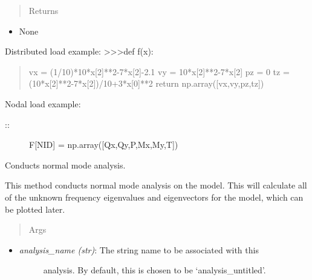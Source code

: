 \documentclass[letterpaper,10pt,english]{sphinxmanual}
\begin{document}
\begin{fulllineitems}
\begin{fulllineitems}
\begin{itemize}
\begin{description}
\end{description}

\end{itemize}
\begin{quote}\begin{description}
\item[{Returns}] \leavevmode
\end{description}\end{quote}
\begin{itemize}
\item {} 
None

\end{itemize}

Distributed load example:
\textgreater{}\textgreater{}\textgreater{}def f(x):
\begin{quote}

vx = (1/10)*10*x{[}2{]}**2-7*x{[}2{]}-2.1
vy = 10*x{[}2{]}**2-7*x{[}2{]}
pz = 0
tz = (10*x{[}2{]}**2-7*x{[}2{]})/10+3*x{[}0{]}**2
return np.array({[}vx,vy,pz,tz{]})
\end{quote}

Nodal load example:
\begin{description}
\item[{::}] \leavevmode
F{[}NID{]} = np.array({[}Qx,Qy,P,Mx,My,T{]})

\end{description}

\end{fulllineitems}


\begin{fulllineitems}
\label{FEM:AeroComBAT.FEM.Model.normalModesAnalysis}
Conducts normal mode analysis.

This method conducts normal mode analysis on the model. This will
calculate all of the unknown frequency eigenvalues and eigenvectors for
the model, which can be plotted later.
\begin{quote}\begin{description}
\item[{Args}] \leavevmode
\end{description}\end{quote}
\begin{itemize}
\item {} \begin{description}
\item[{\emph{analysis\_name (str)}: The string name to be associated with this}] \leavevmode
analysis. By default, this is chosen to be `analysis\_untitled'.


\end{description}
\end{itemize}
\end{fulllineitems}
\end{fulllineitems}
\end{document}
